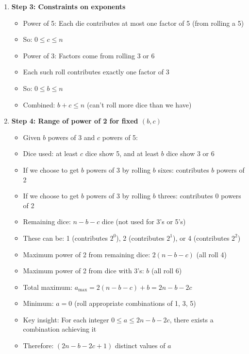 \documentclass[12pt]{article}
\begin{document}
\begin{techniquesbox}
\begin{itemize}[leftmargin=*]
\begin{enumerate}
        \item \textbf{Step 3: Constraints on exponents}
        \begin{itemize}
            \item Power of 5: Each die contributes at most one factor of 5 (from rolling a 5)
            \item So: $0 \leq c \leq n$
            \item Power of 3: Factors come from rolling 3 or 6
            \item Each such roll contributes exactly one factor of 3
            \item So: $0 \leq b \leq n$
            \item Combined: $b + c \leq n$ (can't roll more dice than we have)
        \end{itemize}
        
        \item \textbf{Step 4: Range of power of 2 for fixed $(b, c)$}
        \begin{itemize}
            \item Given $b$ powers of 3 and $c$ powers of 5:
            \item Dice used: at least $c$ dice show 5, and at least $b$ dice show 3 or 6
            \item If we choose to get $b$ powers of 3 by rolling $b$ sixes: contributes $b$ powers of 2
            \item If we choose to get $b$ powers of 3 by rolling $b$ threes: contributes 0 powers of 2
            \item Remaining dice: $n - b - c$ dice (not used for 3's or 5's)
            \item These can be: 1 (contributes $2^0$), 2 (contributes $2^1$), or 4 (contributes $2^2$)
            \item Maximum power of 2 from remaining dice: $2(n-b-c)$ (all roll 4)
            \item Maximum power of 2 from dice with 3's: $b$ (all roll 6)
            \item Total maximum: $a_{\max} = 2(n-b-c) + b = 2n - b - 2c$
            \item Minimum: $a = 0$ (roll appropriate combinations of 1, 3, 5)
            \item Key insight: For each integer $0 \leq a \leq 2n - b - 2c$, there exists a combination achieving it
            \item Therefore: $(2n - b - 2c + 1)$ distinct values of $a$
        \end{itemize}
        

\end{enumerate}
\end{itemize}
\end{techniquesbox}
\end{document}

